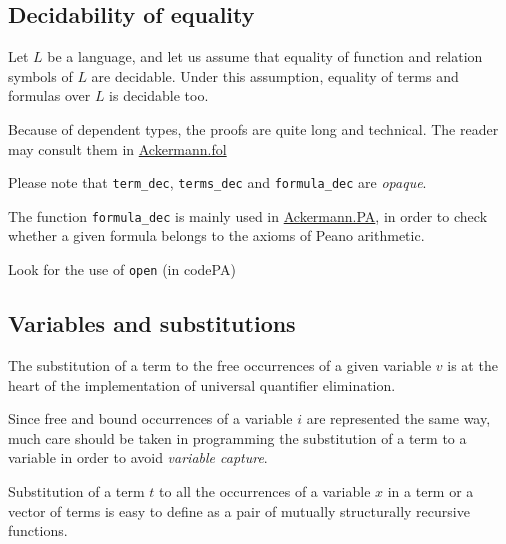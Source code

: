 
\subsection{Decidability of equality}

Let $L$ be a language, and let us assume that equality 
of function and relation symbols of $L$ are decidable.
Under this assumption, equality of terms and formulas over $L$ is decidable too.

Because of dependent types, the proofs are quite long and technical. The reader may consult them in \href{../theories/html/hydras.Ackermann.fol.html}{Ackermann.fol}





\begin{remark}
Please note that \texttt{term\_dec}, \texttt{terms\_dec} and
\texttt{formula\_dec} are \emph{opaque}. 

The function \texttt{formula\_dec} is mainly used in
\href{../theories/html/hydras.Ackermann.PA.html}{Ackermann.PA}, in order to check whether a given formula belongs to the axioms of Peano arithmetic.

\begin{todo}
  Look for the use of \texttt{open}  (in codePA)
\end{todo}

\end{remark}


\subsection{Variables and substitutions}

The substitution of a term to the free occurrences of a given variable $v$ is at the heart of the implementation of universal
quantifier elimination. 

Since free and bound occurrences of a variable $i$ are represented the same way, much care should be taken in programming the substitution of a term to a variable in order to avoid \emph{variable capture}.

Substitution of a term $t$ to all the occurrences of a variable $x$ in a term or a vector of terms is easy to define as a pair of mutually structurally recursive functions.




